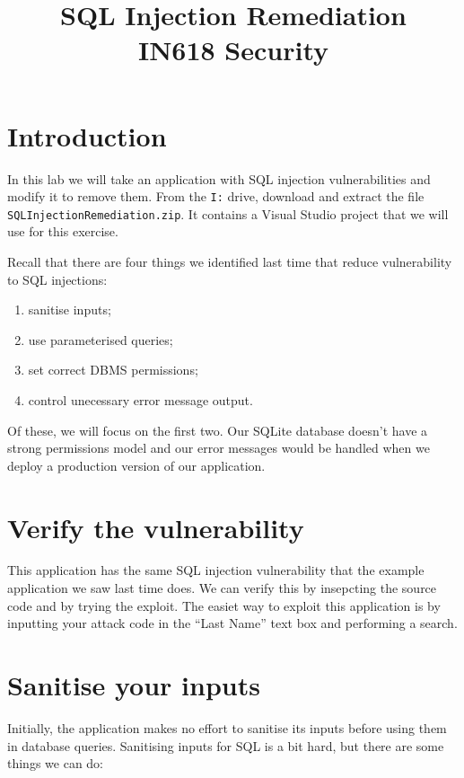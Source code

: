 \documentclass{article}
\begin{document}
\title{SQL Injection Remediation\\ IN618 Security}
\date{}
\maketitle

\section*{Introduction}
In this lab we will take an application with SQL injection vulnerabilities and 
modify it to remove them.  From the \texttt{I:} drive, download and extract
the file \texttt{SQLInjectionRemediation.zip}.  It contains a Visual Studio 
project that we will use for this exercise.

Recall that there are four things we identified last time that reduce
vulnerability to SQL injections:

\begin{enumerate}
	\item sanitise inputs;
	\item use parameterised queries;
	\item set correct DBMS permissions;
	\item control unecessary error message output.
\end{enumerate}

Of these, we will focus on the first two.  Our SQLite database doesn't
have a strong permissions model and our error messages would be handled
when we deploy a production version of our application.

\section{Verify the vulnerability}
This application has the same SQL injection vulnerability that the example
application we saw last time does. We can verify this by insepcting the source code
and by trying the exploit. The easiet way to exploit this application is by inputting 
your attack code in the ``Last Name'' text box and performing a search.

\section{Sanitise your inputs}
Initially, the application makes no effort to sanitise its inputs before
using them in database queries.  Sanitising inputs for SQL is a bit hard, but there
are some things we can do:
\end{document}
